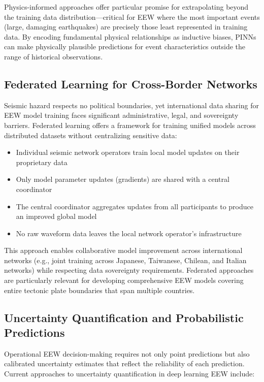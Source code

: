 \documentclass[review,authoryear]{elsarticle}
\begin{document}
Physics-informed approaches offer particular promise for extrapolating beyond the training data distribution---critical for EEW where the most important events (large, damaging earthquakes) are precisely those least represented in training data. By encoding fundamental physical relationships as inductive biases, PINNs can make physically plausible predictions for event characteristics outside the range of historical observations.

\subsection{Federated Learning for Cross-Border Networks}

Seismic hazard respects no political boundaries, yet international data sharing for EEW model training faces significant administrative, legal, and sovereignty barriers. Federated learning \citep{mcmahon2017federated} offers a framework for training unified models across distributed datasets without centralizing sensitive data:

\begin{itemize}
\item Individual seismic network operators train local model updates on their proprietary data
\item Only model parameter updates (gradients) are shared with a central coordinator
\item The central coordinator aggregates updates from all participants to produce an improved global model
\item No raw waveform data leaves the local network operator's infrastructure
\end{itemize}

This approach enables collaborative model improvement across international networks (e.g., joint training across Japanese, Taiwanese, Chilean, and Italian networks) while respecting data sovereignty requirements. Federated approaches are particularly relevant for developing comprehensive EEW models covering entire tectonic plate boundaries that span multiple countries.

\subsection{Uncertainty Quantification and Probabilistic Predictions}

Operational EEW decision-making requires not only point predictions but also calibrated uncertainty estimates that reflect the reliability of each prediction. Current approaches to uncertainty quantification in deep learning EEW include:
\end{document}

